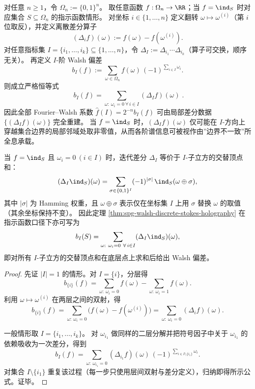 \begin{theorem}\label{thm:spg-walsh-discrete-stokes-holography}
对任意 \(n\ge 1\)，令 \(\Omega_n:=\{0,1\}^n\)。
取任意函数 \(f:\Omega_n\to\RR\)；当 \(f=\ind_S\) 时对应集合 \(S\subseteq\Omega_n\) 的指示函数情形。
对坐标 \(i\in\{1,\dots,n\}\) 定义翻转 \(\omega\mapsto \omega^{(i)}\)（第 \(i\) 位取反），并定义离散差分算子
\[
(\Delta_i f)(\omega):=f(\omega)-f(\omega^{(i)}).
\]
对任意指标集 \(I=\{i_1,\dots,i_k\}\subseteq\{1,\dots,n\}\)，令 \(\Delta_I:=\Delta_{i_1}\cdots\Delta_{i_k}\)（算子可交换，顺序无关）。
再定义 \(I\)-阶 Walsh 偏差
\[
b_I(f):=\sum_{\omega\in\Omega_n} f(\omega)\,(-1)^{\sum_{i\in I}\omega_i}.
\]
则成立严格恒等式
\[
\boxed{\;
b_I(f)=\sum_{\omega:\ \omega_i=0\ \forall\, i\in I} (\Delta_I f)(\omega)\; }.
\]
因此全部 Fourier--Walsh 系数 \(\widehat f(I)=2^{-n}b_I(f)\) 可由局部差分数据 \(\{(\Delta_I f)(\omega)\}\) 完全重建。
当 \(f=\ind_S\) 时，\((\Delta_I f)(\omega)\) 仅可能在 \(I\)-方向上穿越集合边界的局部邻域处取非零值，从而各阶谱信息可被视作由”边界不一致”所全息承载。
\end{theorem}
\begin{remark}[交替顶点和的等价表述]\label{rem:spg-walsh-stokes-alternating-cube-sum}
当 \(f=\ind_S\) 且 \(\omega_i=0\ (i\in I)\) 时，迭代差分 \(\Delta_I\) 等价于 \(I\)-子立方的交替顶点和：
\[
(\Delta_I \ind_S)(\omega)=\sum_{\sigma\in\{0,1\}^I}(-1)^{|\sigma|}\,\ind_S(\omega\oplus \sigma),
\]
其中 \(|\sigma|\) 为 Hamming 权重，且 \(\omega\oplus\sigma\) 表示仅在坐标集 \(I\) 上用 \(\sigma\) 替换 \(\omega\) 的取值（其余坐标保持不变）。
因此定理 \ref{thm:spg-walsh-discrete-stokes-holography} 在指示函数口径下亦可写为
\[
b_I(S)=\sum_{\omega:\ \omega_i=0\ \forall\, i\in I} (\Delta_I \ind_S)(\omega),
\]
即对所有 \(I\)-子立方的交替顶点和在底层点上求和后给出 Walsh 偏差。
\end{remark}
\begin{proof}
先证 \(|I|=1\) 的情形。对 \(I=\{i\}\)，分层得
\[
b_{\{i\}}(f)=\sum_{\omega:\ \omega_i=0} f(\omega)-\sum_{\omega:\ \omega_i=1} f(\omega).
\]
利用 \(\omega\mapsto \omega^{(i)}\) 在两层之间的双射，得
\[
b_{\{i\}}(f)=\sum_{\omega:\ \omega_i=0}\bigl(f(\omega)-f(\omega^{(i)})\bigr)
=\sum_{\omega:\ \omega_i=0}(\Delta_i f)(\omega).
\]
\par
一般情形取 \(I=\{i_1,\dots,i_k\}\)。
对 \(\omega_{i_1}\) 做同样的二层分解并把符号因子中关于 \(\omega_{i_1}\) 的依赖吸收为一次差分，得到
\[
b_I(f)=\sum_{\omega:\ \omega_{i_1}=0}(\Delta_{i_1}f)(\omega)\,(-1)^{\sum_{i\in I\setminus\{i_1\}}\omega_i}.
\]
对集合 \(I\setminus\{i_1\}\) 重复该过程（每一步只使用层间双射与差分定义），归纳即得所示公式。证毕。
\end{proof}

